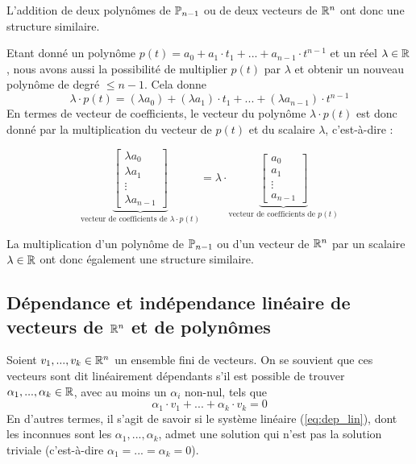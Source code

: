 L'addition de deux polynômes de $\P_{n-1}$ ou de deux vecteurs de $\R^n$ ont donc une structure similaire.

Etant donné un polynôme $p(t) = a_0 + a_1 \cdot t_1 + ... + a_{n-1} \cdot t^{n-1}$ et un réel $\lambda \in \R$, nous avons aussi la possibilité de multiplier $p(t)$ par $\lambda$ et obtenir un nouveau polynôme de degré $\leq n-1$. Cela donne 
$$\lambda \cdot p(t) = (\lambda a_0) + (\lambda a_1) \cdot t_1 + ... + (\lambda a_{n-1}) \cdot t^{n-1}$$
En termes de vecteur de coefficients, le vecteur du polynôme $\lambda \cdot p(t)$ est donc donné par la multiplication du vecteur de $p(t)$ et du scalaire $\lambda$, c'est-à-dire :

$$\underbrace{\begin{bmatrix}
\lambda  a_0 \\ \lambda  a_1  \\ \vdots \\ \lambda  a_{n-1}
\end{bmatrix}}_{\text{vecteur de coefficients de } \lambda \cdot p(t) } =
\lambda \cdot \underbrace{\begin{bmatrix}
a_0 \\ a_1 \\ \vdots \\ a_{n-1}
\end{bmatrix}}_{\text{vecteur de coefficients de } p(t)}$$

La multiplication d'un polynôme de $\P_{n-1}$ ou d'un vecteur de $\R^n$ par un scalaire $\lambda \in \R$ ont donc également une structure similaire.

\subsection{Dépendance et indépendance linéaire de vecteurs de $\R^n$ et de polynômes}
Soient $v_1, ..., v_k \in \R^n$ un ensemble fini de vecteurs. On se souvient que ces vecteurs sont dit linéairement dépendants s'il est possible de trouver $\alpha_1, ..., \alpha_k \in \R$, avec au moins un $\alpha_i$ non-nul, tels que
\begin{equation}
    \alpha_1 \cdot v_1 + ... + \alpha_k \cdot v_k = 0 
    \label{eq:dep_lin}
\end{equation}
En d'autres termes, il s'agit de savoir si le système linéaire (\ref{eq:dep_lin}), dont les inconnues sont les $\alpha_1, ..., \alpha_k$, admet une solution qui n'est pas la solution triviale (c'est-à-dire $\alpha_1 = ... = \alpha_k = 0$).

